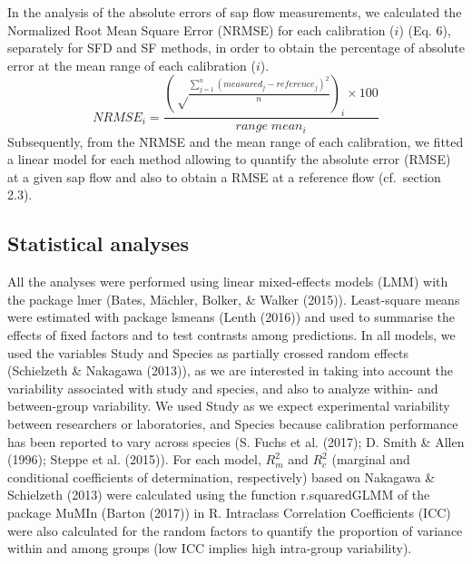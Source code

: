 \documentclass[11pt,twoside]{reedthesis}
\begin{document}
In the analysis of the absolute errors of sap flow measurements, we
calculated the Normalized Root Mean Square Error (NRMSE) for each
calibration (\(i\)) (Eq. 6), separately for SFD and SF methods, in order
to obtain the percentage of absolute error at the mean range of each
calibration (\(i\)).
\begin{equation}
NRMSE_i = \frac{(\sqrt \frac{\sum_{j=1}^{n} (measured_j-reference_j)^2}{n})_i\times 100}{range\;mean_i}
\end{equation}
Subsequently, from the NRMSE and the mean range of each calibration, we
fitted a linear model for each method allowing to quantify the absolute
error (RMSE) at a given sap flow and also to obtain a RMSE at a
reference flow (cf.~section 2.3).\par

\subsection{Statistical analyses}\label{statistical-analyses}

All the analyses were performed using linear mixed-effects models (LMM)
with the package lmer (Bates, Mächler, Bolker, \& Walker (2015)).
Least-square means were estimated with package lsmeans (Lenth (2016))
and used to summarise the effects of fixed factors and to test contrasts
among predictions. In all models, we used the variables Study and
Species as partially crossed random effects (Schielzeth \& Nakagawa
(2013)), as we are interested in taking into account the variability
associated with study and species, and also to analyze within- and
between-group variability. We used Study as we expect experimental
variability between researchers or laboratories, and Species because
calibration performance has been reported to vary across species (S.
Fuchs et al. (2017); D. Smith \& Allen (1996); Steppe et al. (2015)).
For each model, \(R^2_m\) and \(R^2_c\) (marginal and conditional
coefficients of determination, respectively) based on Nakagawa \&
Schielzeth (2013) were calculated using the function r.squaredGLMM of
the package MuMIn (Barton (2017)) in R. Intraclass Correlation
Coefficients (ICC) were also calculated for the random factors to
quantify the proportion of variance within and among groups (low ICC
implies high intra-group variability).\par
\end{document}
